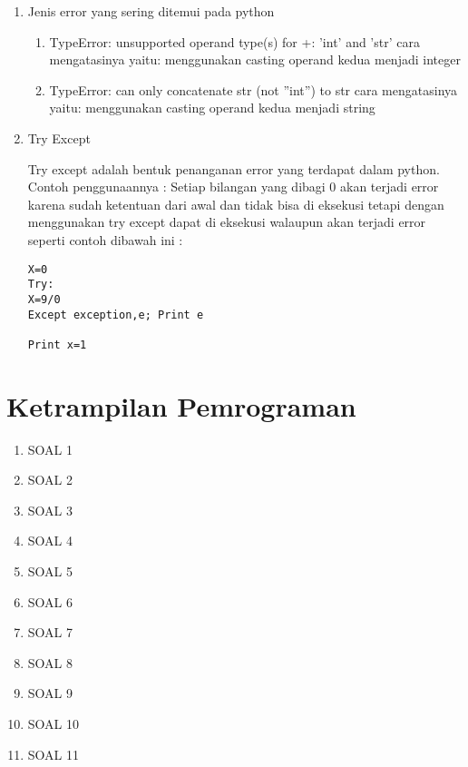 \documentclass[12pt,times new roman]{article}
\begin{document}
\begin{enumerate}
\begin{enumerate}
\begin{verbatim}
\end{verbatim}
\end{enumerate}
\item Jenis error yang sering ditemui pada python
\begin{enumerate}
\item  TypeError: unsupported operand type(s) for +: ’int’ and ’str’ cara mengatasinya yaitu: menggunakan casting operand kedua menjadi integer
\item  TypeError: can only concatenate str (not ”int”) to str cara mengatasinya yaitu: menggunakan casting operand kedua menjadi string
\end{enumerate}
\item Try Except
\par Try except adalah bentuk penanganan error yang terdapat dalam python. Contoh penggunaannya : Setiap bilangan yang dibagi 0 akan terjadi error karena sudah ketentuan dari awal dan tidak bisa di eksekusi tetapi dengan menggunakan try except dapat di eksekusi walaupun akan terjadi error seperti contoh dibawah ini :
\begin{verbatim}
X=0 
Try: 
X=9/0 
Except exception,e; Print e

Print x=1
\end{verbatim}
\end{enumerate}
\section{Ketrampilan Pemrograman}
\begin{enumerate}
\item SOAL 1

\item SOAL 2

\item SOAL 3

\item SOAL 4

\item SOAL 5

\item SOAL 6

\item SOAL 7

\item SOAL 8

\item SOAL 9

\item SOAL 10

\item SOAL 11

\end{enumerate}
\end{document}
